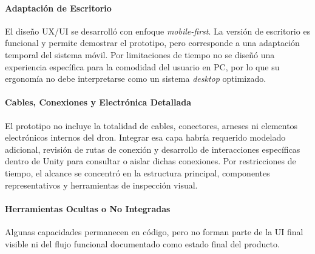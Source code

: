 \paragraph{Adaptación de Escritorio} El diseño UX/UI se desarrolló con enfoque \textit{mobile-first}. La versión de escritorio es funcional y permite demostrar el prototipo, pero corresponde a una adaptación temporal del sistema móvil. Por limitaciones de tiempo no se diseñó una experiencia específica para la comodidad del usuario en PC, por lo que su ergonomía no debe interpretarse como un sistema \textit{desktop} optimizado.

\paragraph{Cables, Conexiones y Electrónica Detallada} El prototipo no incluye la totalidad de cables, conectores, arneses ni elementos electrónicos internos del dron. Integrar esa capa habría requerido modelado adicional, revisión de rutas de conexión y desarrollo de interacciones específicas dentro de Unity para consultar o aislar dichas conexiones. Por restricciones de tiempo, el alcance se concentró en la estructura principal, componentes representativos y herramientas de inspección visual.

\paragraph{Herramientas Ocultas o No Integradas} Algunas capacidades permanecen en código, pero no forman parte de la UI final visible ni del flujo funcional documentado como estado final del producto.

